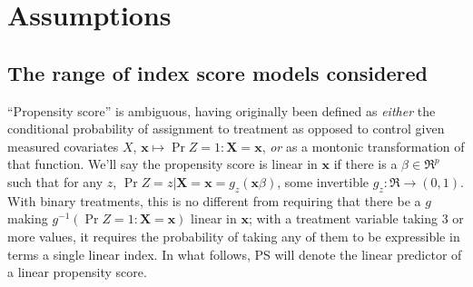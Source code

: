 \documentclass{article}
\theoremstyle{remark}
\begin{document}
\section{Assumptions}
\subsection{The range of index score models considered} \label{sec:range-prop-score}
``Propensity score'' is ambiguous, having originally been defined \citep{rosenbaum:rubi:1983} as \textit{either} the  conditional probability of assignment to treatment as opposed to control given measured covariates $X$, $\mathbf{x} \mapsto \Pr{Z=1: \mathbf{X} = \mathbf{x}} $, \textit{or} as a montonic transformation of that function.  We'll say the propensity score is linear in $\mathbf{x}$ if there is a $\beta \in \Re^{p}$ such that for any 
$z$,  $\Pr{Z = z| \mathbf{X}=\mathbf{x}} = g_{z}(\mathbf{x}\beta)$, some invertible $g_{z}:  \Re \rightarrow (0,1)$. 
With binary treatments, this is no different from requiring that there be a $g$ making $g^{-1}\left( \Pr{Z=1: \mathbf{X}=\mathbf{x}} \right) $ linear in $\mathbf{x}$; with a treatment variable taking 3 or more values, it requires the probability of taking any of them to be expressible in terms a single linear index.  %
 In what follows, PS will denote the linear predictor of a linear propensity score.
\end{document}
